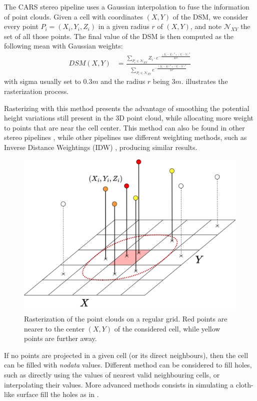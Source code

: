 The CARS stereo pipeline uses a Gaussian interpolation to fuse the information of point clouds. Given a cell with coordinates $(X,Y)$ of the DSM, we consider every point $P_i=(X_i, Y_i, Z_i)$ in a given radius $r$ of $(X,Y)$, and note $\mathcal{N}_{XY}$ the set of all those points. The final value of the DSM is then computed as the following mean with Gaussian weights:
\begin{align}
    DSM(X,Y) &= \frac{\sum_{P_i\in\mathcal{N}_{XY}}Z_i\cdot e^{-\frac{(X_i-X)^2+(Y_i-Y)^2}{2\sigma^2}}}{\sum_{P_i\in\mathcal{N}_{XY}} e^{-\frac{(X_i-X)^2+(Y_i-Y)^2}{2\sigma^2}}}
\end{align}
with sigma usually set to $0.3m$ and the radius $r$ being $3m$.  illustrates the rasterization process.

Rasterizing with this method presents the advantage of smoothing the potential height variations still present in the 3D point cloud, while allocating more weight to points that are near the cell center. This method can also be found in other stereo pipelines \cite{shean_automated_2016}, while other pipelines use different weighting methods, such as Inverse Distance Weightings (IDW) \cite{rupnik_micmac_2017}, producing similar results.

\begin{figure}
    \centering
    \includegraphics[width=0.7\linewidth]{Images/Chap_1/Rasterization.png}
    \caption{Rasterization of the point clouds on a regular grid. Red points are nearer to the center $(X,Y)$ of the considered cell, while yellow points are further away.}
    \label{fig:rasterization}
\end{figure}

\begin{remark}
    If no points are projected in a given cell (or its direct neighbours), then the cell can be filled with \textit{nodata} values. Different method can be considered to fill holes, such as directly using the values of nearest valid neighbouring cells, or interpolating their values. More advanced methods consists in simulating a cloth-like surface fill the holes as in \cite{lallement_bulldozer_2022}.
\end{remark}

